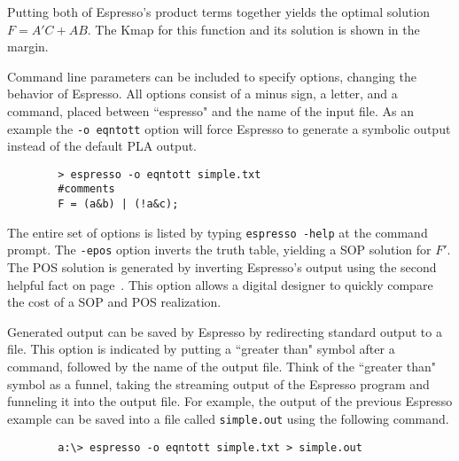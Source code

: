 \begin{changemargin}{1.5cm}{1.5cm}
Putting both of Espresso's product terms together yields the
optimal solution $F=A'C+AB$.  The Kmap for this function and
its \SOPmin solution is shown in the margin.



Command line parameters can be included to specify options, 
 changing the behavior of Espresso.
All options consist of a minus sign, a letter, and a command, 
placed between ``espresso" and the name of the input file. As an 
example the \verb+-o eqntott+ option will force Espresso to generate a
symbolic output instead of the default PLA output.
\end{changemargin}

\begin{verbatim}
        > espresso -o eqntott simple.txt
        #comments
        F = (a&b) | (!a&c);
\end{verbatim}

The entire set of options is listed by typing 
\verb+espresso -help+ at the command prompt. The \verb+-epos+ option
inverts the truth table, yielding a SOP solution for
$F'$.  The POS solution is generated by inverting Espresso's
output using the second helpful fact on page~\pageref{page:second}.
This option allows a digital designer to quickly compare the
cost of a SOP and POS realization.

Generated output can be saved by Espresso by redirecting standard
output to a file.  This option is indicated by putting a ``greater than" symbol after a
command, followed by the name of the output file.
Think of the ``greater than" symbol as a funnel, taking 
the streaming output of the Espresso program and funneling it into
the output file.  For example, the output of the previous Espresso example can
be saved into a file called \verb+simple.out+ using the following command.

\begin{verbatim}
        a:\> espresso -o eqntott simple.txt > simple.out
\end{verbatim}


